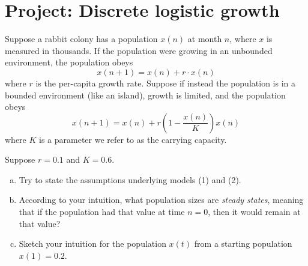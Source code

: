 \documentclass{exam}
\begin{document}
\section*{Project: Discrete logistic growth}
 
Suppose a rabbit colony has a population $x(n)$ at month $n$, where $x$ is measured in thousands. If the population were growing in an unbounded environment, the population obeys
\begin{equation}
x(n+1) = x(n) + r \cdot x(n)
\end{equation} 
where $r$ is the per-capita growth rate. Suppose if instead the population is in a bounded environment (like an island), growth is limited, and the population obeys
\begin{equation}
x(n+1) = x(n) + r \left( 1- \frac{x(n)}{K}\right) x(n)
\end{equation} 
where $K$ is a parameter we refer to as the carrying capacity. 

Suppose $r=0.1$ and $K=0.6$. 
\begin{enumerate}[a.]
\item Try to state the assumptions underlying models (1) and (2). 
\item According to your intuition, what population sizes are \textit{steady states}, meaning that if the population had that value at time $n=0$, then it would remain at that value?
\item Sketch your intuition for the population $x(t)$ from a starting population $x(1)=0.2$. 
\end{enumerate}
\end{document}
